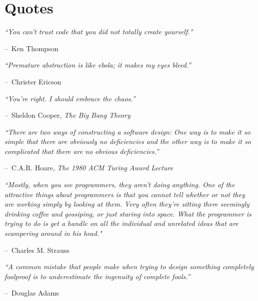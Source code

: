 \documentclass{report}
\makeatletter
\newenvironment{chapquote}[2][2em]
  {\setlength{\@tempdima}{#1}%
   \def\chapquote@author{#2}%
   \parshape 1 \@tempdima \dimexpr\textwidth-2\@tempdima\relax%
   \itshape}
  {\par\normalfont\hfill--\ \chapquote@author\hspace*{\@tempdima}\par\bigskip}
\makeatother
\begin{document}
\section*{Quotes}
\begin{chapquote}{Ken Thompson \textit{}}
``You can’t trust code that you did not totally create yourself."
\end{chapquote}

\begin{chapquote}{Christer Ericson \textit{}}
``Premature abstraction is like ebola; it makes my eyes bleed.''
\end{chapquote}

\begin{chapquote}{Sheldon Cooper, \textit{The Big Bang Theory}}
``You're right. I should embrace the chaos.''
\end{chapquote}

\begin{chapquote}{C.A.R. Hoare, \textit{The 1980 ACM Turing Award Lecture}}
``There are two ways of constructing a software design: One way is to make it so simple that there are obviously no deficiencies and the other way is to make it so complicated that there are no obvious deficiencies.''
\end{chapquote}

\begin{chapquote}{Charles M. Strauss \textit{}}
``Mostly, when you see programmers, they aren’t doing anything. One of the attractive things about programmers is that you cannot tell whether or not they are working simply by looking at them. Very often they're sitting there seemingly drinking coffee and gossiping, or just staring into space. What the programmer is trying to do is get a handle on all the individual and unrelated ideas that are scampering around in his head."
\end{chapquote}

\begin{chapquote}{Douglas Adams}
``A common mistake that people make when trying to design something completely foolproof is to underestimate the ingenuity of complete fools.''
\end{chapquote}
\section*{}
\end{document}
